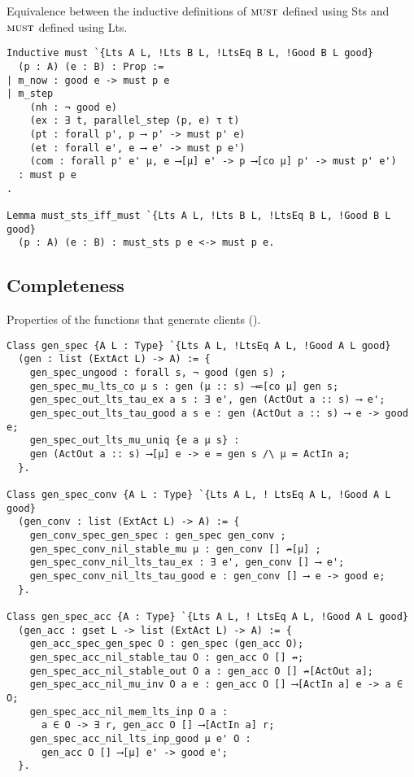 Equivalence between the inductive definitions of $\operatorname{\textsc{must}}$ defined using Sts and $\operatorname{\textsc{must}}$ defined using Lts.

\begin{mdframed}
\begin{verbatim}
Inductive must `{Lts A L, !Lts B L, !LtsEq B L, !Good B L good}
  (p : A) (e : B) : Prop :=
| m_now : good e -> must p e
| m_step
    (nh : ¬ good e)
    (ex : ∃ t, parallel_step (p, e) τ t)
    (pt : forall p', p ⟶ p' -> must p' e)
    (et : forall e', e ⟶ e' -> must p e')
    (com : forall p' e' μ, e ⟶[μ] e' -> p ⟶[co μ] p' -> must p' e')
  : must p e
.

Lemma must_sts_iff_must `{Lts A L, !Lts B L, !LtsEq B L, !Good B L good}
  (p : A) (e : B) : must_sts p e <-> must p e.
\end{verbatim}
\end{mdframed}



\subsection{Completeness}

Properties of the functions that generate clients ().

\begin{mdframed}
\begin{verbatim}
Class gen_spec {A L : Type} `{Lts A L, !LtsEq A L, !Good A L good}
  (gen : list (ExtAct L) -> A) := {
    gen_spec_ungood : forall s, ¬ good (gen s) ;
    gen_spec_mu_lts_co μ s : gen (μ :: s) ⟶⋍[co μ] gen s;
    gen_spec_out_lts_tau_ex a s : ∃ e', gen (ActOut a :: s) ⟶ e';
    gen_spec_out_lts_tau_good a s e : gen (ActOut a :: s) ⟶ e -> good e;
    gen_spec_out_lts_mu_uniq {e a μ s} :
    gen (ActOut a :: s) ⟶[μ] e -> e = gen s /\ μ = ActIn a;
  }.

Class gen_spec_conv {A L : Type} `{Lts A L, ! LtsEq A L, !Good A L good}
  (gen_conv : list (ExtAct L) -> A) := {
    gen_conv_spec_gen_spec : gen_spec gen_conv ;
    gen_spec_conv_nil_stable_mu μ : gen_conv [] ↛[μ] ;
    gen_spec_conv_nil_lts_tau_ex : ∃ e', gen_conv [] ⟶ e';
    gen_spec_conv_nil_lts_tau_good e : gen_conv [] ⟶ e -> good e;
  }.

Class gen_spec_acc {A : Type} `{Lts A L, ! LtsEq A L, !Good A L good}
  (gen_acc : gset L -> list (ExtAct L) -> A) := {
    gen_acc_spec_gen_spec O : gen_spec (gen_acc O);
    gen_spec_acc_nil_stable_tau O : gen_acc O [] ↛;
    gen_spec_acc_nil_stable_out O a : gen_acc O [] ↛[ActOut a];
    gen_spec_acc_nil_mu_inv O a e : gen_acc O [] ⟶[ActIn a] e -> a ∈ O;
    gen_spec_acc_nil_mem_lts_inp O a :
      a ∈ O -> ∃ r, gen_acc O [] ⟶[ActIn a] r;
    gen_spec_acc_nil_lts_inp_good μ e' O :
      gen_acc O [] ⟶[μ] e' -> good e';
  }.
\end{verbatim}
\end{mdframed}

